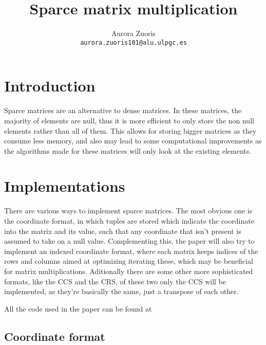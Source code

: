 \documentclass{article}
\author{Aurora Zuoris \\ \texttt{aurora.zuoris101@alu.ulpgc.es}}
\title{Sparce matrix multiplication}
\begin{document}
\maketitle


\section{Introduction}

Sparce matrices are an alternative to dense matrices.
In these matrices, the majority of elements are null, thus it is more efficient to only store the
non null elements rather than all of them. This allows for storing bigger matrices as they consume less memory,
and also may lead to some computational improvements as the algorithms made for these matrices will only look at the existing elements.

\section{Implementations}

There are various ways to implement sparce matrices.
The most obvious one is the coordinate format, in which tuples are stored which indicate the coordinate into the matrix and its value,
such that any coordinate that isn't present is assumed to take on a null value.
Complementing this, the paper will also try to implement an indexed coordinate format, where each matrix keeps indices of the rows and columns
aimed at optimizing iterating these, which may be beneficial for matrix multiplications.
Aditionally there are some other more sophisticated formats, like the CCS and the CRS,
of these two only the CCS will be implemented, as they're basically the same, just a transpose of each other.

All the code used in the paper can be found at %

\subsection{Coordinate format}
\end{document}
